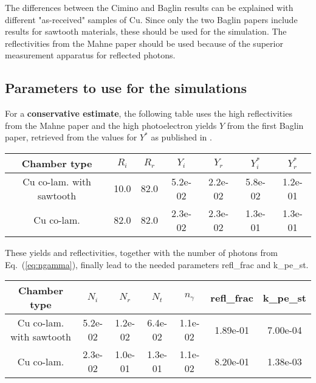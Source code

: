 The differences between the Cimino and Baglin results can be explained with different "as-received" samples of Cu.
Since only the two Baglin papers include results for sawtooth materials, these should be used for the simulation.
The reflectivities from the Mahne paper should be used because of the superior measurement apparatus for reflected photons.

\subsection{Parameters to use for the simulations}
\label{sec:parameters}
For a \textbf{conservative estimate}, the following table uses the high reflectivities from the Mahne paper and the high photoelectron yields $Y$ from the first Baglin paper, retrieved from the values for $Y^*$ as published in \cite{baglin}.

\begin{center}
    \begin{tabular}{c|cccc|cc}
	Chamber type & $R_i$ & $R_r$ & $Y_i$ & $Y_r$ & $Y_i^*$ & $Y_r^*$  \\ \hline 
	Cu co-lam. with sawtooth &10.0 &82.0 &5.2e-02 &2.2e-02& 5.8e-02 &1.2e-01 \\
	Cu co-lam. &82.0 &82.0 &2.3e-02 &2.3e-02& 1.3e-01 &1.3e-01 \\
    \end{tabular}
\end{center}
These yields and reflectivities, together with the number of photons from Eq.~(\ref{eq:ngamma}), finally lead to the needed parameters refl\_frac and k\_pe\_st.

\begin{center}
    \begin{tabular}{c|ccc|c|cc}
	Chamber type & $N_i$ & $N_r$ & $N_t$ & $n_\gamma$ & refl\_frac & k\_pe\_st \\ \hline 
	Cu co-lam. with sawtooth& 5.2e-02 &1.2e-02 &6.4e-02 &1.1e-02 &1.89e-01 &7.00e-04\\
	Cu co-lam.& 2.3e-02 &1.0e-01 &1.3e-01 &1.1e-02 &8.20e-01 &1.38e-03\\
    \end{tabular}

\end{center}

